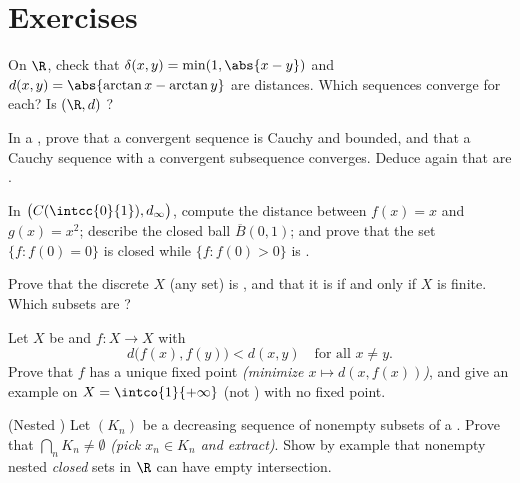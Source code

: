 \section{Exercises}

\begin{exercise}[$\star$]\label{exo:b2:metric:1}
On $\R$, check that $\delta(x, y) = \min(1, \abs{x - y})$ and
$d(x,y) = \abs{\arctan x - \arctan y}$ are distances. Which
sequences converge for each? Is $(\R, d)$ ?
\end{exercise}

\begin{exercise}[$\star$]\label{exo:b2:metric:2}
In a , prove that a convergent sequence is Cauchy and
bounded, and that a Cauchy sequence with a convergent subsequence
converges. Deduce again that  are .
\end{exercise}

\begin{exercise}[$\star$]\label{exo:b2:metric:3}
In $\bigl(C(\intcc{0}{1}), d_\infty\bigr)$, compute the distance
between $f(x) = x$ and $g(x) = x^2$; describe the closed ball
$\overline B(0, 1)$; and prove that the set $\{f : f(0) = 0\}$ is
closed while $\{f : f(0) > 0\}$ is .
\end{exercise}

\begin{exercise}[$\star\star$]\label{exo:b2:metric:4}
Prove that the discrete  $X$ (any set) is , and
that it is  if and only if $X$ is finite. Which subsets are
?
\end{exercise}

\begin{exercise}[$\star\star$]\label{exo:b2:metric:5}
Let $X$ be  and $f \colon X \to X$ with
\[
d\bigl(f(x), f(y)\bigr) < d(x, y) \quad \text{for all } x \neq y .
\]
Prove that $f$ has a unique fixed point \emph{(minimize $x \mapsto
d(x, f(x))$)}, and give an example on $X = \intco{1}{+\infty}$
(not ) with no fixed point.
\end{exercise}

\begin{exercise}[$\star\star$]\label{exo:b2:metric:6}
(Nested ) Let $(K_n)$ be a decreasing sequence of nonempty
 subsets of a . Prove that $\bigcap_n K_n \neq
\emptyset$ \emph{(pick $x_n \in K_n$ and extract)}. Show by example
that nonempty nested \emph{closed} sets in $\R$ can have empty
intersection.
\end{exercise}

